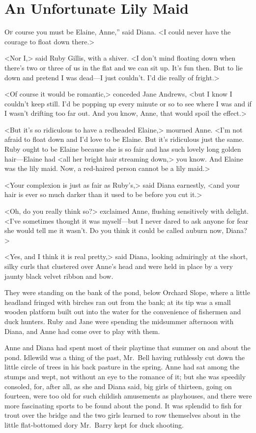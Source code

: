 \chapter{An Unfortunate Lily Maid}

\lettrine[ante=“,]{O}{f} course you must be Elaine, Anne,” said Diana. <I could never have the courage to float down there.>

<Nor I,> said Ruby Gillis, with a shiver. <I don't mind floating down when there's two or three of us in the flat and we can sit up. It's fun then. But to lie down and pretend I was dead—I just couldn't. I'd die really of fright.>

<Of course it would be romantic,> conceded Jane Andrews, <but I know I couldn't keep still. I'd be popping up every minute or so to see where I was and if I wasn't drifting too far out. And you know, Anne, that would spoil the effect.>

<But it's so ridiculous to have a redheaded Elaine,> mourned Anne. <I'm not afraid to float down and I'd love to be Elaine. But it's ridiculous just the same. Ruby ought to be Elaine because she is so fair and has such lovely long golden hair—Elaine had <all her bright hair streaming down,> you know. And Elaine was the lily maid. Now, a red-haired person cannot be a lily maid.>

<Your complexion is just as fair as Ruby's,> said Diana earnestly, <and your hair is ever so much darker than it used to be before you cut it.>

<Oh, do you really think so?> exclaimed Anne, flushing sensitively with delight. <I've sometimes thought it was myself—but I never dared to ask anyone for fear she would tell me it wasn't. Do you think it could be called auburn now, Diana?>

<Yes, and I think it is real pretty,> said Diana, looking admiringly at the short, silky curls that clustered over Anne's head and were held in place by a very jaunty black velvet ribbon and bow.

They were standing on the bank of the pond, below Orchard Slope, where a little headland fringed with birches ran out from the bank; at its tip was a small wooden platform built out into the water for the convenience of fishermen and duck hunters. Ruby and Jane were spending the midsummer afternoon with Diana, and Anne had come over to play with them.

Anne and Diana had spent most of their playtime that summer on and about the pond. Idlewild was a thing of the past, Mr.~Bell having ruthlessly cut down the little circle of trees in his back pasture in the spring. Anne had sat among the stumps and wept, not without an eye to the romance of it; but she was speedily consoled, for, after all, as she and Diana said, big girls of thirteen, going on fourteen, were too old for such childish amusements as playhouses, and there were more fascinating sports to be found about the pond. It was splendid to fish for trout over the bridge and the two girls learned to row themselves about in the little flat-bottomed dory Mr.~Barry kept for duck shooting.


